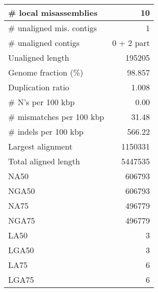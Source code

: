 \documentclass[12pt,a4paper]{article}
\begin{document}
\begin{table}[ht]
\begin{center}
\begin{tabular}{|l*{1}{|r}|}
\# local misassemblies & 10 \\ \hline
\# unaligned mis. contigs & 1 \\ \hline
\# unaligned contigs & 0 + 2 part \\ \hline
Unaligned length & 195205 \\ \hline
Genome fraction (\%) & 98.857 \\ \hline
Duplication ratio & 1.008 \\ \hline
\# N's per 100 kbp & 0.00 \\ \hline
\# mismatches per 100 kbp & 31.48 \\ \hline
\# indels per 100 kbp & 566.22 \\ \hline
Largest alignment & 1150331 \\ \hline
Total aligned length & 5447535 \\ \hline
NA50 & 606793 \\ \hline
NGA50 & 606793 \\ \hline
NA75 & 496779 \\ \hline
NGA75 & 496779 \\ \hline
LA50 & 3 \\ \hline
LGA50 & 3 \\ \hline
LA75 & 6 \\ \hline
LGA75 & 6 \\ \hline
\end{tabular}
\end{center}
\end{table}
\end{document}
